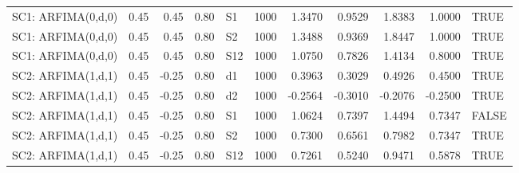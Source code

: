 \begin{table}[ht]
\begin{tabular}{lrrrlrrrrrl}
  SC1: ARFIMA(0,d,0) & 0.45 & 0.45 & 0.80 & S1 & 1000 & 1.3470 & 0.9529 & 1.8383 & 1.0000 & TRUE \\ 
  SC1: ARFIMA(0,d,0) & 0.45 & 0.45 & 0.80 & S2 & 1000 & 1.3488 & 0.9369 & 1.8447 & 1.0000 & TRUE \\ 
  SC1: ARFIMA(0,d,0) & 0.45 & 0.45 & 0.80 & S12 & 1000 & 1.0750 & 0.7826 & 1.4134 & 0.8000 & TRUE \\ 
  SC2: ARFIMA(1,d,1) & 0.45 & -0.25 & 0.80 & d1 & 1000 & 0.3963 & 0.3029 & 0.4926 & 0.4500 & TRUE \\ 
  SC2: ARFIMA(1,d,1) & 0.45 & -0.25 & 0.80 & d2 & 1000 & -0.2564 & -0.3010 & -0.2076 & -0.2500 & TRUE \\ 
  SC2: ARFIMA(1,d,1) & 0.45 & -0.25 & 0.80 & S1 & 1000 & 1.0624 & 0.7397 & 1.4494 & 0.7347 & FALSE \\ 
  SC2: ARFIMA(1,d,1) & 0.45 & -0.25 & 0.80 & S2 & 1000 & 0.7300 & 0.6561 & 0.7982 & 0.7347 & TRUE \\ 
  SC2: ARFIMA(1,d,1) & 0.45 & -0.25 & 0.80 & S12 & 1000 & 0.7261 & 0.5240 & 0.9471 & 0.5878 & TRUE \\ 
   \hline
\end{tabular}
\end{table}
